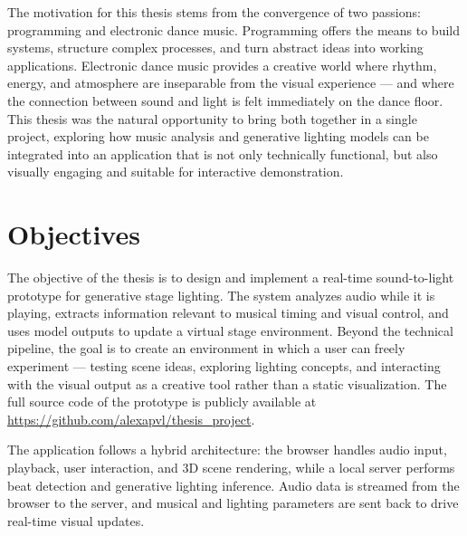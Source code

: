 The motivation for this thesis stems from the convergence of two passions: programming and electronic dance music. Programming offers the means to build systems, structure complex processes, and turn abstract ideas into working applications. Electronic dance music provides a creative world where rhythm, energy, and atmosphere are inseparable from the visual experience — and where the connection between sound and light is felt immediately on the dance floor. This thesis was the natural opportunity to bring both together in a single project, exploring how music analysis and generative lighting models can be integrated into an application that is not only technically functional, but also visually engaging and suitable for interactive demonstration.

\section{Objectives}

The objective of the thesis is to design and implement a real-time sound-to-light prototype for generative stage lighting. The system analyzes audio while it is playing, extracts information relevant to musical timing and visual control, and uses model outputs to update a virtual stage environment. Beyond the technical pipeline, the goal is to create an environment in which a user can freely experiment — testing scene ideas, exploring lighting concepts, and interacting with the visual output as a creative tool rather than a static visualization. The full source code of the prototype is publicly available at \url{https://github.com/alexapvl/thesis_project}.

The application follows a hybrid architecture: the browser handles audio input, playback, user interaction, and 3D scene rendering, while a local server performs beat detection and generative lighting inference. Audio data is streamed from the browser to the server, and musical and lighting parameters are sent back to drive real-time visual updates.

